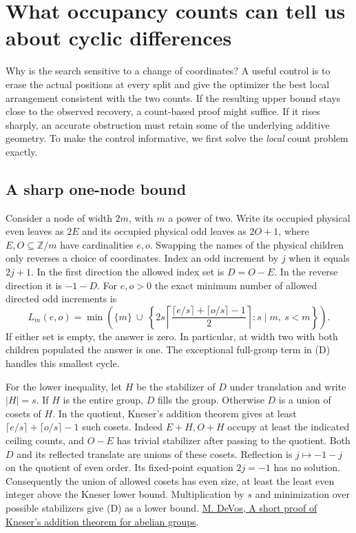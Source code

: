 \section{What occupancy counts can tell us about cyclic differences}
\label{sec:geometry}
Why is the search sensitive to a change of coordinates? A useful control is to erase the actual positions at every split and give the optimizer the best local arrangement consistent with the two counts. If the resulting upper bound stays close to the observed recovery, a count-based proof might suffice. If it rises sharply, an accurate obstruction must retain some of the underlying additive geometry. To make the control informative, we first solve the \emph{local} count problem exactly.

\subsection{A sharp one-node bound}
Consider a node of width \(2m\), with \(m\) a power of two. Write its occupied physical even leaves as \(2E\) and its occupied physical odd leaves as \(2O+1\), where \(E,O\subseteq\mathbb Z/m\) have cardinalities \(e,o\). Swapping the names of the physical children only reverses a choice of coordinates. Index an odd increment by \(j\) when it equals \(2j+1\). In the first direction the allowed index set is \(D=O-E\). In the reverse direction it is \(-1-D\). For \(e,o>0\) the exact minimum number of allowed directed odd increments is
\[
 L_m(e,o)=\min\!\left(\{m\}\ \cup\
 \left\{2s\left\lceil
 \frac{\lceil e/s\rceil+\lceil o/s\rceil-1}{2}\right\rceil:
             s\mid m,\ s<m\right\}\right).                  \tag{D}
\]
If either set is empty, the answer is zero. In particular, at width two with both children populated the answer is one. The exceptional full-group term in (D) handles this smallest cycle.

For the lower inequality, let \(H\) be the stabilizer of \(D\) under translation and write \(|H|=s\). If \(H\) is the entire group, \(D\) fills the group. Otherwise \(D\) is a union of cosets of \(H\). In the quotient, Kneser's addition theorem gives at least
\(\lceil e/s\rceil+\lceil o/s\rceil-1\) such cosets. Indeed \(E+H,O+H\) occupy at least the indicated ceiling counts, and \(O-E\) has trivial stabilizer after passing to the quotient. Both \(D\) and its reflected translate are unions of these cosets. Reflection is \(j\mapsto-1-j\) on the quotient of even order. Its fixed-point equation \(2j=-1\) has no solution. Consequently the union of allowed cosets has even size, at least the least even integer above the Kneser lower bound. Multiplication by \(s\) and minimization over possible stabilizers give (D) as a lower bound. \href{https://arxiv.org/abs/1303.3539}{M. DeVos, A short proof of Kneser's addition theorem for abelian groups}.

